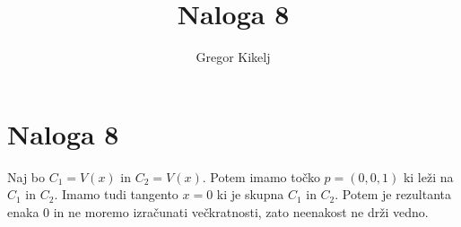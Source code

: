 \documentclass[12pt]{article}
\title{Naloga 8}
\author{Gregor Kikelj}
\begin{document}
\section{Naloga 8}
Naj bo $C_1=V(x)$ in $C_2=V(x)$. Potem imamo točko $p=(0, 0, 1)$ ki leži na $C_1$ in $C_2$. Imamo tudi tangento $x=0$ ki je skupna $C_1$ in $C_2$. Potem je rezultanta enaka 0 in ne moremo
izračunati večkratnosti, zato neenakost ne drži vedno. 
\end{document}
